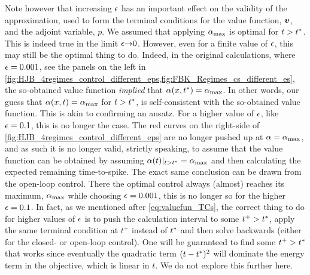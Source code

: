 \documentclass[12pt]{iopart}
\begin{document}
Note however that increasing ${\epsilon}$ has an important effect on the validity of
the approximation, used to form the terminal conditions for the value function,
${ \boldsymbol{v} }$, and the adjoint variable, $p$. We assumed that applying ${ {\alpha}_{\textrm{max}} }$ is
optimal for $t>{ t^* }$. This is indeed true in the limit ${\epsilon} {\rightarrow} 0$. However, even for a
finite value of ${\epsilon}$, this may still be the optimal thing to do. Indeed, in
the original calculations, where ${\epsilon}=0.001$, see the panels on the left in
\cref{fig:HJB_4regimes_control_different_eps,fig:FBK_Regimes_cs_different_es},
the so-obtained value function {\sl implied} that ${\alpha}(x,{ t^* }) = { {\alpha}_{\textrm{max}} }$. In
other words, our guess that ${\alpha}(x, t) = { {\alpha}_{\textrm{max}} }$ for $t > { t^* }$, is
self-consistent with the so-obtained value function. This is akin to confirming an ansatz. For a higher
value of ${\epsilon}$, like ${\epsilon} = 0.1$, this is no longer the case. The red curves
on the right-side of \cref{fig:HJB_4regimes_control_different_eps} are no longer
pushed up at ${\alpha} = { {\alpha}_{\textrm{max}} }$, and as such it is no longer valid, strictly speaking,
to assume that the value function can be obtained by assuming ${\alpha}(t)|_{t>{ t^* }} =
{ {\alpha}_{\textrm{max}} }$ and then calculating the expected remaining time-to-spike. The exact same
conclusion can be drawn from the open-loop control. There the optimal control
always (almost) reaches its maximum, ${ {\alpha}_{\textrm{max}} }$ while choosing ${\epsilon} = 0.001$,
this is no longer so for the higher ${\epsilon} = 0.1$. In fact, as we mentioned
after \cref{eq:valuefun_TCs}, the correct thing to do for higher values of ${\epsilon}$ is
to push the calculation interval to some $t^+ > { t^* }$, apply the same terminal
condition at $t^+$ instead of ${ t^* }$ and then solve backwards (either for the
closed- or open-loop control). One will be guaranteed to find some $t^+ > { t^* }$
that works since eventually the quadratic term $(t-{ t^* })^2$ will dominate the
energy term in the objective, which is linear in $t$. We do not explore this
further here.
\end{document}
